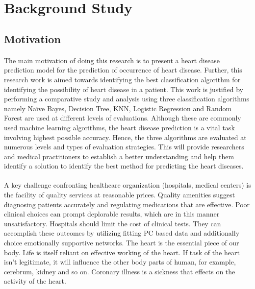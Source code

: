 \documentclass{book}
\begin{document}
    \section{Background Study}
    \subsection{Motivation}

    \paragraph{}
    The main motivation of doing this research is to present a heart disease prediction model for the prediction of occurrence of heart disease. Further, this research work is aimed towards identifying the best classification algorithm for identifying the possibility of heart disease in a patient. This work is justified by performing a comparative study and analysis using three classification algorithms namely Naïve Bayes, Decision Tree, KNN, Logistic Regression and Random Forest are used at different levels of evaluations. Although these are commonly used machine learning algorithms, the heart disease prediction is a vital task involving highest possible accuracy. Hence, the three algorithms are evaluated at numerous levels and types of evaluation strategies. This will provide researchers and medical practitioners to establish a better understanding and help them identify a solution to identify the best method for predicting the heart diseases.
    \paragraph{}
    A key challenge confronting healthcare organization (hospitals, medical centers) is the facility of quality services at reasonable prices. Quality amenities suggest diagnosing patients accurately and regulating medications that are effective. Poor clinical choices can prompt deplorable results, which are in this manner unsatisfactory. Hospitals should limit the cost of clinical tests. They can accomplish these outcomes by utilizing fitting PC based data and additionally choice emotionally supportive networks. The heart is the essential piece of our body. Life is itself reliant on effective working of the heart. If task of the heart isn't legitimate, it will influence the other body parts of human, for example, cerebrum, kidney and so on. Coronary illness is a sickness that effects on the activity of the heart.
\end{document}
